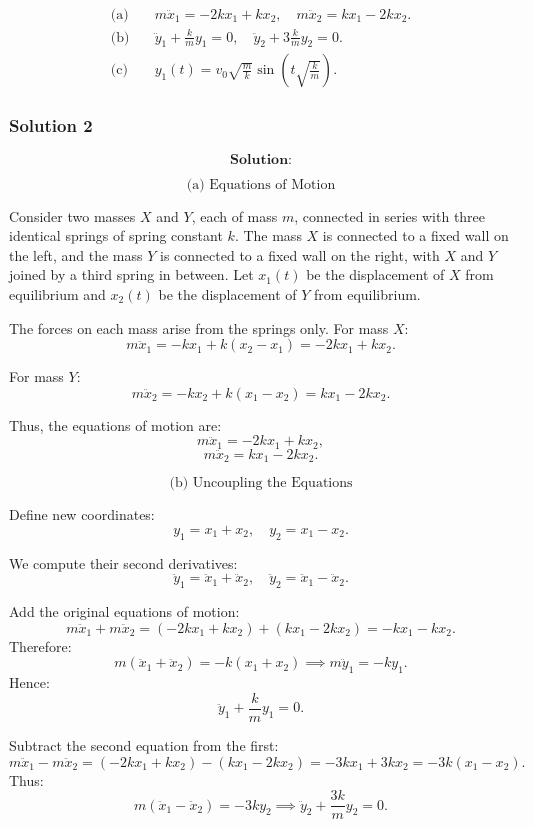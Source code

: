 \documentclass{article}
\begin{document}
\[
\boxed{
\begin{aligned}
\text{(a)}& \quad m\ddot{x}_1 = -2k x_1 + k x_2,\quad m\ddot{x}_2 = k x_1 - 2k x_2. \\[6pt]
\text{(b)}& \quad \ddot{y}_1 + \tfrac{k}{m} y_1 = 0,\quad \ddot{y}_2 + 3\tfrac{k}{m}y_2 = 0. \\[6pt]
\text{(c)}& \quad y_1(t) = v_0 \sqrt{\tfrac{m}{k}}\sin\left(t\sqrt{\tfrac{k}{m}}\right).
\end{aligned}
}
\] 

\subsubsection{Solution 2}
\[
\textbf{Solution:}
\]

\[
\text{(a) Equations of Motion}
\]

Consider two masses $X$ and $Y$, each of mass $m$, connected in series with three identical springs of spring constant $k$. The mass $X$ is connected to a fixed wall on the left, and the mass $Y$ is connected to a fixed wall on the right, with $X$ and $Y$ joined by a third spring in between. Let $x_1(t)$ be the displacement of $X$ from equilibrium and $x_2(t)$ be the displacement of $Y$ from equilibrium.

The forces on each mass arise from the springs only. For mass $X$:
\[
m\ddot{x}_1 = -k x_1 + k(x_2 - x_1) = -2k x_1 + k x_2.
\]

For mass $Y$:
\[
m\ddot{x}_2 = -k x_2 + k(x_1 - x_2) = k x_1 - 2k x_2.
\]

Thus, the equations of motion are:
\[
m\ddot{x}_1 = -2k x_1 + k x_2,
\]
\[
m\ddot{x}_2 = k x_1 - 2k x_2.
\]

\[
\text{(b) Uncoupling the Equations}
\]

Define new coordinates:
\[
y_1 = x_1 + x_2, \quad y_2 = x_1 - x_2.
\]

We compute their second derivatives:
\[
\ddot{y}_1 = \ddot{x}_1 + \ddot{x}_2, \quad \ddot{y}_2 = \ddot{x}_1 - \ddot{x}_2.
\]

Add the original equations of motion:
\[
m\ddot{x}_1 + m\ddot{x}_2 = (-2kx_1 + kx_2) + (kx_1 - 2kx_2) = -kx_1 - kx_2.
\]
Therefore:
\[
m(\ddot{x}_1 + \ddot{x}_2) = -k(x_1 + x_2) \implies m\ddot{y}_1 = -k y_1.
\]
Hence:
\[
\ddot{y}_1 + \frac{k}{m}y_1 = 0.
\]

Subtract the second equation from the first:
\[
m\ddot{x}_1 - m\ddot{x}_2 = (-2kx_1 + kx_2) - (kx_1 - 2kx_2) = -3kx_1 + 3kx_2 = -3k(x_1 - x_2).
\]
Thus:
\[
m(\ddot{x}_1 - \ddot{x}_2) = -3k y_2 \implies \ddot{y}_2 + \frac{3k}{m}y_2 = 0.
\]
\end{document}

